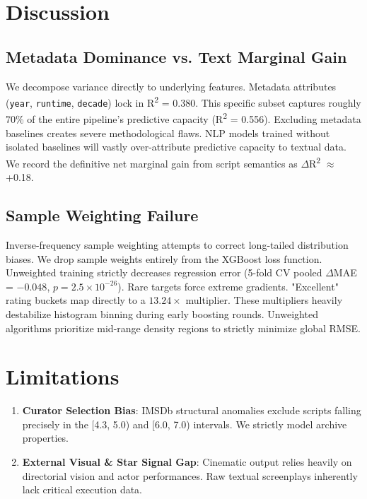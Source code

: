 \documentclass[conference]{IEEEtran}
\begin{document}
\section{Discussion}

\subsection{Metadata Dominance vs. Text Marginal Gain}
We decompose variance directly to underlying features. Metadata attributes (\texttt{year}, \texttt{runtime}, \texttt{decade}) lock in R\textsuperscript{2} = 0.380. This specific subset captures roughly 70\% of the entire pipeline's predictive capacity (R\textsuperscript{2} = 0.556). Excluding metadata baselines creates severe methodological flaws. NLP models trained without isolated baselines will vastly over-attribute predictive capacity to textual data. We record the definitive net marginal gain from script semantics as $\Delta$R\textsuperscript{2} $\approx$ +0.18.

\subsection{Sample Weighting Failure}
Inverse-frequency sample weighting attempts to correct long-tailed distribution biases. We drop sample weights entirely from the XGBoost loss function. Unweighted training strictly decreases regression error (5-fold CV pooled $\Delta$MAE = $-0.048$, $p = 2.5 \times 10^{-26}$). Rare targets force extreme gradients. "Excellent" rating buckets map directly to a $13.24\times$ multiplier. These multipliers heavily destabilize histogram binning during early boosting rounds. Unweighted algorithms prioritize mid-range density regions to strictly minimize global RMSE.

\section{Limitations}

\begin{enumerate}
\item \textbf{Curator Selection Bias}: IMSDb structural anomalies exclude scripts falling precisely in the [4.3, 5.0) and [6.0, 7.0) intervals. We strictly model archive properties. 
\item \textbf{External Visual \& Star Signal Gap}: Cinematic output relies heavily on directorial vision and actor performances. Raw textual screenplays inherently lack critical execution data.
\end{enumerate}
\end{document}
